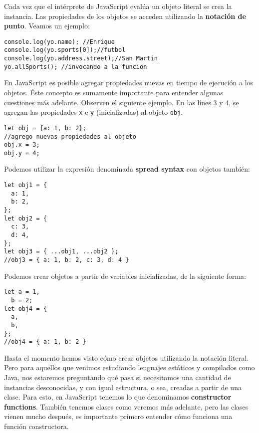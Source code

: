 \documentclass[a4paper, oneside, titlepage, 12pt]{paper}
\begin{document}
Cada vez que el intérprete de JavaScript evalúa un objeto literal se crea la instancia. Las propiedades de los objetos se acceden utilizando la \textbf{notación de punto}. Veamos un ejemplo:

\begin{verbatim}
console.log(yo.name); //Enrique
console.log(yo.sports[0]);//futbol
console.log(yo.address.street);//San Martin
yo.allSports(); //invocando a la funcion               
\end{verbatim}

En JavaScript es posible agregar propiedades nuevas en tiempo de ejecución a los objetos. Éste concepto es sumamente importante para entender algunas cuestiones más adelante. Observen el siguiente ejemplo. En las línes 3 y 4, se agregan las propiedades \texttt{x} e \texttt{y} (inicializadas) al objeto \texttt{obj}.

\begin{verbatim}
let obj = {a: 1, b: 2};
//agrego nuevas propiedades al objeto
obj.x = 3;
obj.y = 4;
\end{verbatim}

Podemos utilizar la expresión denominada \textbf{spread syntax} con objetos también:

\begin{verbatim}
let obj1 = {
  a: 1,
  b: 2,
};
let obj2 = {
  c: 3,
  d: 4,
};
let obj3 = { ...obj1, ...obj2 };
//obj3 = { a: 1, b: 2, c: 3, d: 4 }
\end{verbatim}

Podemos crear objetos a partir de variables inicializadas, de la siguiente forma:

\begin{verbatim}
let a = 1,
  b = 2;
let obj4 = {
  a,
  b,
};
//obj4 = { a: 1, b: 2 }	
\end{verbatim}

Hasta el momento hemos visto cómo crear objetos utilizando la notación literal. Pero para aquellos que venimos estudiando lenguajes estáticos y compilados como Java, nos estaremos preguntando qué pasa si necesitamos una cantidad de instancias desconocidas, y con igual estructura, o sea, creadas a partir de una clase. Para esto, en JavaScript tenemos lo que denominamos \textbf{constructor functions}. También tenemos clases como veremos más adelante, pero las clases vienen mucho después, es importante primero entender cómo funciona una función constructora.
\newline
\end{document}
